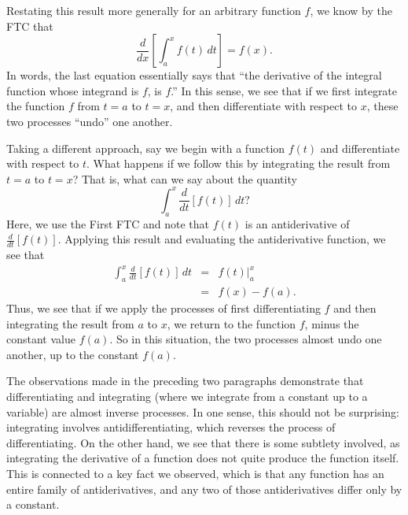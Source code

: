 Restating this result more generally for an arbitrary function $f$, we know by the FTC that
\[ \frac{d}{dx} \left[ \int_a^x f(t) \, dt \right] = f(x). \]
In words, the last equation essentially says that ``the derivative of the integral function whose integrand is $f$, is $f$.''  In this sense, we see that if we first integrate the function $f$ from $t = a$ to $t = x$, and then differentiate with respect to $x$, these two processes ``undo'' one another.

Taking a different approach, say we begin with a function $f(t)$ and differentiate with respect to $t$.  What happens if we follow this by integrating the result from $t = a$ to $t = x$?  That is, what can we say about the quantity
\[ \int_a^x \frac{d}{dt} \left[ f(t) \right] \, dt? \]
Here, we use the First FTC and note that $f(t)$ is an antiderivative of $\frac{d}{dt} \left[ f(t) \right].$  Applying this result and evaluating the antiderivative function, we see that
\begin{eqnarray*}
\int_a^x \frac{d}{dt} \left[ f(t) \right] \, dt & = & f(t) \bigg\vert_a^x \\
							& = & f(x) - f(a).
\end{eqnarray*} 
Thus, we see that if we apply the processes of first differentiating $f$ and then integrating the result from $a$ to $x$, we return to the function $f$, minus the constant value $f(a)$.  So in this situation, the two processes almost undo one another, up to the constant $f(a)$.

The observations made in the preceding two paragraphs demonstrate that differentiating and integrating (where we integrate from a constant up to a variable) are almost inverse processes.  In one sense, this should not be surprising:  integrating involves antidifferentiating, which reverses the process of differentiating.  On the other hand, we see that there is some subtlety involved, as integrating the derivative of a function does not quite produce the function itself.  This is connected to a key fact we observed, which is that any function has an entire family of antiderivatives, and any two of those antiderivatives differ only by a constant.

\newpage

